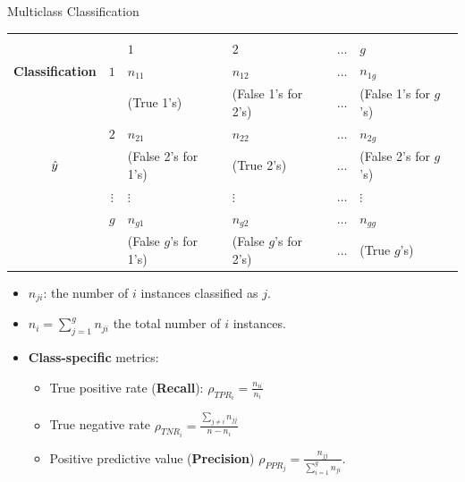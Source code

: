 \documentclass[11pt,compress,t,notes=noshow, aspectratio=169, xcolor=table]{beamer}
\begin{document}
\begin{frame}{Multiclass Classification}
	\small{
		\begin{center}
			\tiny
			\begin{tabular}{cc|>{\centering\arraybackslash}p{8em}>{\centering\arraybackslash}p{8em}>{\centering\arraybackslash}p{5em}>{\centering\arraybackslash}p{8em}}
				& & \multicolumn{4}{c}{\bfseries True Class $y$} \\
				& & $1$ & $2$ & $\ldots$ & $g$  \\
				\hline
				\bfseries Classification     & $1$ & $n_{11}$  &  $n_{12}$  & $\ldots$ &  $n_{1g}$ \\
				& & (True 1's) & (False 1's for 2's) & $\ldots$ &  (False 1's for $g$'s)  \\
				& $2$ &  $n_{21}$  &  $n_{22}$  & $\ldots$ & $n_{2g}$  \\
				$\hat{y}$ & & (False 2's for 1's) & (True 2's) & $\ldots$ &  (False 2's for $g$'s)  \\
				& $\vdots$ & $\vdots$ & $\vdots$ & $\ldots$ & $\vdots$ \\
				& $g$ & $n_{g1}$ & $n_{g2}$  & $\ldots$ &  $n_{gg}$\\
				& & (False $g$'s for 1's) & (False $g$'s for 2's) & $\ldots$ &  (True $g$'s)  \\
			\end{tabular}
		\end{center}
		
		\begin{itemize}
			\item $n_{ji}$: the number of $i$ instances classified as $j$.

            \item $n_i = \sum_{j=1}^g n_{ji}$ the total number of $i$ instances.

            \item \textbf{Class-specific} metrics:
                \begin{itemize}
                    \small
                    
                    \item True positive rate (\textbf{Recall}): $\rho_{TPR_i} = \frac{n_{ii}}{n_i}$
    
                    \item True negative rate $\rho_{TNR_i} = \frac{\sum_{j\neq i}n_{jj}}{n-n_i}$ 
    
                    \item Positive predictive value (\textbf{Precision}) $\rho_{PPR_j} = \frac{n_{jj}}{\sum_{i=1}^g n_{ji}}$.
                    
                \end{itemize}

		\end{itemize}
	}
\end{frame}
\end{document}
